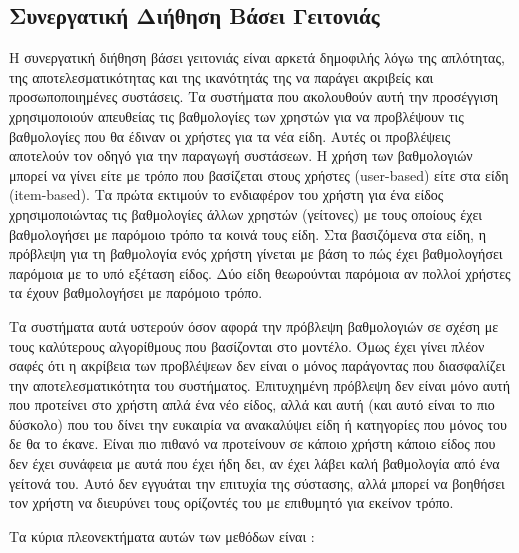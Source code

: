 \subsection{Συνεργατική Διήθηση Βάσει Γειτονιάς}
Η συνεργατική διήθηση βάσει γειτονιάς είναι αρκετά δημοφιλής λόγω της απλότητας, της αποτελεσματικότητας και της ικανότητάς της να παράγει ακριβείς και προσωποποιημένες συστάσεις.\cite{ricci2011recommender} Τα συστήματα που ακολουθούν αυτή την προσέγγιση χρησιμοποιούν απευθείας τις βαθμολογίες των χρηστών για να προβλέψουν τις βαθμολογίες που θα έδιναν οι χρήστες για τα νέα είδη. Αυτές οι προβλέψεις αποτελούν τον οδηγό για την παραγωγή συστάσεων. Η χρήση των βαθμολογιών μπορεί να γίνει είτε με τρόπο που βασίζεται στους χρήστες ({\en user-based}) είτε στα είδη ({\en item-based}). Τα πρώτα εκτιμούν το ενδιαφέρον του χρήστη για ένα είδος χρησιμοποιώντας τις βαθμολογίες άλλων χρηστών (γείτονες) με τους οποίους έχει βαθμολογήσει με παρόμοιο τρόπο τα κοινά τους είδη. Στα βασιζόμενα στα είδη, η πρόβλεψη για τη βαθμολογία ενός χρήστη γίνεται με βάση το πώς έχει βαθμολογήσει παρόμοια με το υπό εξέταση είδος. Δύο είδη θεωρούνται παρόμοια αν πολλοί χρήστες τα έχουν βαθμολογήσει με παρόμοιο τρόπο. \par
Τα συστήματα αυτά υστερούν όσον αφορά την πρόβλεψη βαθμολογιών σε σχέση με τους καλύτερους αλγορίθμους που βασίζονται στο μοντέλο.\cite{Koren:2008:FMN:1401890.1401944, Takacs:2007:MCG:1345448.1345466} Όμως έχει γίνει πλέον σαφές ότι η ακρίβεια των προβλέψεων δεν είναι ο μόνος παράγοντας που διασφαλίζει την αποτελεσματικότητα του συστήματος. Επιτυχημένη πρόβλεψη δεν είναι μόνο αυτή που προτείνει στο χρήστη απλά ένα νέο είδος, αλλά και αυτή (και αυτό είναι το πιο δύσκολο) που του δίνει την ευκαιρία να ανακαλύψει είδη ή κατηγορίες που μόνος του δε θα το έκανε.\cite{Good:1999:CCF:315149.315352} Είναι πιο πιθανό να προτείνουν σε κάποιο χρήστη κάποιο είδος που δεν έχει συνάφεια με αυτά που έχει ήδη δει, αν έχει λάβει καλή βαθμολογία από ένα γείτονά του. Αυτό δεν εγγυάται την επιτυχία της σύστασης, αλλά μπορεί να βοηθήσει τον χρήστη να διευρύνει τους ορίζοντές του με επιθυμητό για εκείνον τρόπο. \par
Τα κύρια πλεονεκτήματα αυτών των μεθόδων είναι \cite{ricci2011recommender}:
